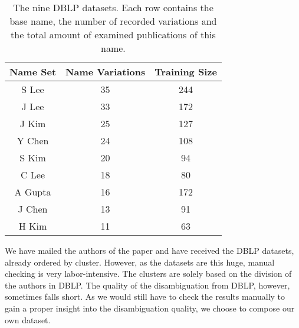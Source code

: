 \begin{table}
	\centering
		\begin{tabular}[ht]{|c|c|c|}
			\hline
			\bfseries{Name Set} & \bfseries{Name Variations} & \bfseries{Training Size} \\
			\hline
			S Lee & 35 & 244 \\
			\hline
			J Lee & 33 & 172 \\
			\hline
			J Kim & 25 & 127 \\
			\hline
			Y Chen & 24 & 108 \\
			\hline
			S Kim & 20 & 94 \\
			\hline
			C Lee & 18 & 80 \\
			\hline
			A Gupta & 16 & 172 \\
			\hline
			J Chen & 13 & 91 \\
			\hline
			H Kim & 11 & 63 \\
			\hline
		\end{tabular}
	\caption{The nine DBLP datasets. Each row contains the base name, the number of recorded variations and the total amount of examined publications of this name.}
	\label{tab:auth-dblp-dataset}
\end{table}

We have mailed the authors of the paper \cite{han2004two} and have received the DBLP datasets, already ordered by cluster. However, as the datasets are this huge, manual checking is very labor-intensive. The clusters are solely based on the division of the authors in DBLP. The quality of the disambiguation from DBLP, however, sometimes falls short. As we would still have to check the results manually to gain a proper insight into the disambiguation quality, we choose to compose our own dataset.

